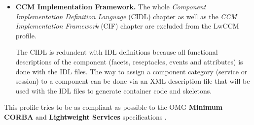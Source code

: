 \begin{itemize}
\item {\bf CCM Implementation Framework.}
The whole {\it Component Implementation Definition Language} (CIDL) chapter 
as well as the {\it CCM Implementation Framework} (CIF) chapter are excluded 
from the LwCCM profile.

The CIDL is redundent with IDL definitions because all functional descriptions
of the component (facets, reseptacles, events and attributes) is done with the 
IDL files.
The way to assign a component category (service or session) to a component
can be done via an XML description file that will be used with the IDL files to
generate container code and skeletons.
\end{itemize}

\noindent
This profile tries to be as compliant as possible to the OMG 
{\bf Minimum CORBA} and {\bf Lightweight Services} specifications 
\cite{Minimum_CORBA, LightweightServices}.


